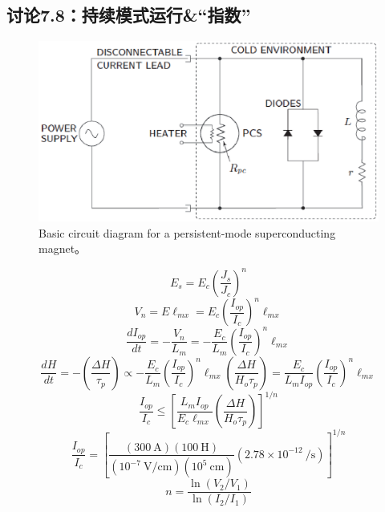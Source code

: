 \subsection{讨论7.8：持续模式运行\&“指数”}

\begin{figure}[htbp]
	\centering
	\includegraphics[scale=0.7]{chpt7/figs/fig7.22.eps}
	\caption{Basic circuit diagram for a persistent-mode superconducting magnet。}
\end{figure}




\begin{equation}%
E_s=E_c\left(\frac{J_s}{J_c}\right)^n
\end{equation}
\begin{equation}%
V_n=E\ell_{mx}=E_c\left(\frac{I_{op}}{I_c}\right)^n\ell_{mx}
\end{equation}
\begin{equation}%
\frac{dI_{op}}{dt}=-\frac{V_n}{L_m}=-\frac{E_c}{L_m}\left(\frac{I_{op}}{I_c}\right)^n\ell_{mx}
\end{equation}
\begin{equation}%
\frac{dH}{dt}=-\left(\frac{\Delta H}{\tau_p}\right)\propto-\frac{E_c}{L_m}\left(\frac{I_{op}}{I_c}\right)^n\ell_{mx}
\left(\frac{\Delta H}{H_o\tau_p}\right)=\frac{E_c}{L_m I_{op}}\left(\frac{I_{op}}{I_c}\right)^n\ell_{mx}
\end{equation}
\begin{equation}%
\frac{I_{op}}{I_c}\leq\left[\frac{L_mI_{op}}{E_c\ell_{mx}}\left(\frac{\Delta H}{H_o\tau_p}\right)\right]^{1/n}
\end{equation}
\begin{equation}%
\frac{I_{op}}{I_c}=\left[\frac{(300\ \mathrm{A})(100\ \mathrm{H})}{(10^{-7}\ \mathrm{V/cm})(10^5\ \mathrm{cm})}(2.78\times 10^{-12}\ \mathrm{/s})\right]^{1/n}
\end{equation}
\begin{equation}%
n=\frac{\ln(V_2/V_1)}{\ln(I_2/I_1)}
\end{equation}



